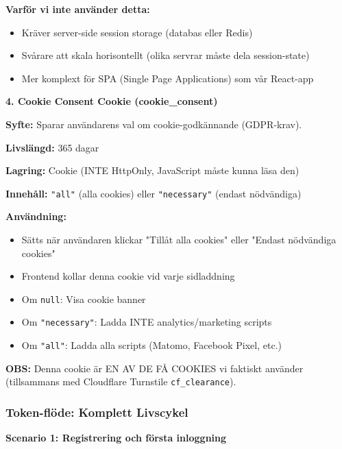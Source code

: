 \documentclass[12pt,a4paper]{article}
\begin{document}
\textbf{Varför vi inte använder detta:}
\begin{itemize}[noitemsep]
  \item Kräver server-side session storage (databas eller Redis)
  \item Svårare att skala horisontellt (olika servrar måste dela session-state)
  \item Mer komplext för SPA (Single Page Applications) som vår React-app
\end{itemize}

\textbf{4. Cookie Consent Cookie (cookie\_consent)}

\textbf{Syfte:} Sparar användarens val om cookie-godkännande (GDPR-krav).

\textbf{Livslängd:} 365 dagar

\textbf{Lagring:} Cookie (INTE HttpOnly, JavaScript måste kunna läsa den)

\textbf{Innehåll:} \texttt{"all"} (alla cookies) eller \texttt{"necessary"} (endast nödvändiga)

\textbf{Användning:}
\begin{itemize}[noitemsep]
  \item Sätts när användaren klickar "Tillåt alla cookies" eller "Endast nödvändiga cookies"
  \item Frontend kollar denna cookie vid varje sidladdning
  \item Om \texttt{null}: Visa cookie banner
  \item Om \texttt{"necessary"}: Ladda INTE analytics/marketing scripts
  \item Om \texttt{"all"}: Ladda alla scripts (Matomo, Facebook Pixel, etc.)
\end{itemize}

\textbf{OBS:} Denna cookie är EN AV DE FÅ COOKIES vi faktiskt använder (tillsammans med Cloudflare Turnstile \texttt{cf\_clearance}).

\subsubsection{Token-flöde: Komplett Livscykel}

\textbf{Scenario 1: Registrering och första inloggning}
\end{document}
